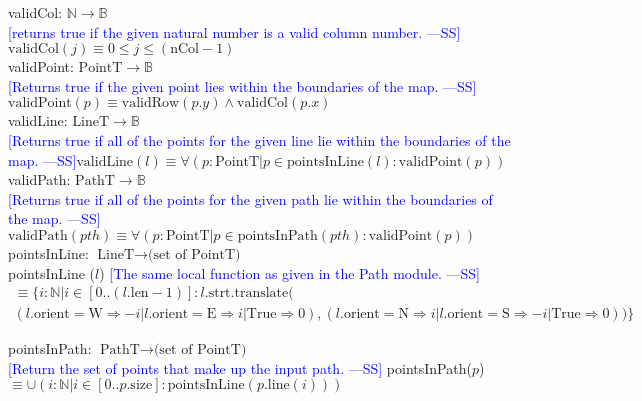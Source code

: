 \documentclass[12pt]{article}
\newcommand{\authornote}[3]{\textcolor{#1}{[#3 ---#2]}}
\newcommand{\authornote}[3]{}
\newcommand{\wss}[1]{\authornote{blue}{SS}{#1}}
\begin{document}
\noindent validCol: $\mathbb{N} \rightarrow \mathbb{B}$\\
\noindent \wss{returns true if the given natural number is a valid column
  number.}$\mbox{validCol}(j) \equiv 0 \leq j \leq (\mbox{nCol} - 1)$\\

\noindent validPoint: $\mbox{PointT} \rightarrow \mathbb{B}$\\
\noindent \wss{Returns true if the given point lies within the boundaries of the
  map.}$\mbox{validPoint}(p) \equiv \mbox{validRow}(p.y) \wedge \mbox{validCol}(p.x)$\\

\noindent validLine: $\mbox{LineT} \rightarrow \mathbb{B}$\\
\noindent \wss{Returns true if all of the points for the given line lie within the boundaries of the
  map.}$\mbox{validLine}(l) \equiv \forall(p: \mbox{PointT} | p \in \mbox{pointsInLine}(l):
  \mbox{validPoint}(p))$\\

\noindent validPath: $\mbox{PathT} \rightarrow \mathbb{B}$\\
\noindent \wss{Returns true if all of the points for the given path lie within the boundaries of the
  map.}$\mbox{validPath}(\mathit{pth}) \equiv \forall(p: \mbox{PointT} | p \in \mbox{pointsInPath}(\mathit{pth}):
  \mbox{validPoint}(p))$\\

\noindent pointsInLine: $\mbox{LineT} \rightarrow \mbox{(set of PointT)}$\\
\noindent pointsInLine ($l$) 
\wss{The same local function as given in the Path module.}
\begin{multline*}
\equiv \{ i: \mathbb{N} | i \in [0
  .. (l.\mbox{len} - 1)] : l.\mbox{strt}.\mbox{translate}(\\
(l.\mbox{orient}=\mbox{W} \Rightarrow -i |
  l.\mbox{orient}=\mbox{E} \Rightarrow i | \mbox{True} \Rightarrow 0), (l.\mbox{orient}=\mbox{N} \Rightarrow i |
  l.\mbox{orient}=\mbox{S} \Rightarrow -i | \mbox{True} \Rightarrow 0) ) \}
\end{multline*}

\noindent pointsInPath: $\mbox{PathT} \rightarrow \mbox{(set of PointT)}$\\
\wss{Return the set of points that make up the input path.}
\noindent pointsInPath($p$) 
$\equiv \cup (i: \mathbb{N} | i \in [0..p.\mbox{size}]:
\mbox{pointsInLine}(p.\mbox{line}(i)))$

\newpage
\end{document}
